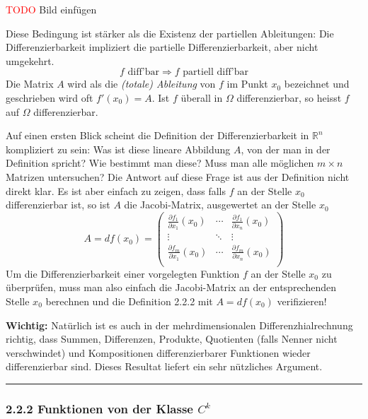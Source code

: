 \documentclass[a4paper,landscape,8pt]{extarticle}
\newcommand{\R}{\mathbb{R}}
\newcommand{\todo}{\textcolor{red}{TODO }}
\newcommand{\sep}{\vspace{5pt}\noindent\hrule\vspace{5pt}}
\newcommand{\Wichtig}{\textbf{Wichtig: }}
\begin{document}
\begin{multicols*}{4}
\begin{warmup}
\todo{Bild einfügen}
\end{warmup}

Diese Bedingung ist stärker als die Existenz der partiellen Ableitungen: Die
Differenzierbarkeit impliziert die partielle Differenzierbarkeit, aber nicht
umgekehrt.
\[ f \text{ diff'bar} \Longrightarrow f \text{ partiell diff'bar} \] Die Matrix
$A$ wird als die \emph{(totale) Ableitung} von $f$ im Punkt $x_0$ bezeichnet und
geschrieben wird oft $f'(x_0)=A$. Ist $f$ überall in $\Omega$ differenzierbar,
so heisst $f$ auf $\Omega$ differenzierbar.

Auf einen ersten Blick scheint die Definition der Differenzierbarkeit in $\R^n$
kompliziert zu sein: Was ist diese lineare Abbildung $A$, von der man in der
Definition spricht? Wie bestimmt man diese? Muss man alle möglichen $m\times n$
Matrizen untersuchen? Die Antwort auf diese Frage ist aus der Definition nicht
direkt klar. Es ist aber einfach zu zeigen, dass falls $f$ an der Stelle $x_0$
differenzierbar ist, so ist $A$ die Jacobi-Matrix, ausgewertet an der Stelle
$x_0$
\[
A = df(x_0) = \begin{pmatrix}
\frac{\partial f_1}{\partial x_1}(x_0) & \cdots & \frac{\partial f_1}{\partial
x_n}(x_0)\\
\vdots & \ddots & \vdots\\
\frac{\partial f_m}{\partial x_1}(x_0) & \cdots & \frac{\partial f_m}{\partial
x_n}(x_0)\\
\end{pmatrix}
\]
Um die Differenzierbarkeit einer vorgelegten Funktion $f$ an der Stelle $x_0$ zu
überprüfen, muss man also einfach die Jacobi-Matrix an der entsprechenden Stelle
$x_0$ berechnen und die Definition 2.2.2 mit $A=df(x_0)$ verifizieren!

\Wichtig Natürlich ist es auch in der mehrdimensionalen Differenzhialrechnung
richtig, dass Summen, Differenzen, Produkte, Quotienten (falls Nenner nicht verschwindet)
und Kompositionen differenzierbarer Funktionen wieder differenzierbar sind.
Dieses Resultat liefert ein sehr nützliches Argument.

\sep

\subsubsection{2.2.2 Funktionen von der Klasse $C^k$}


\end{multicols*}
\end{document}
